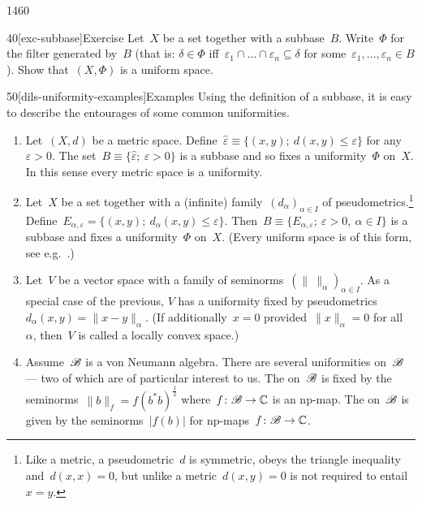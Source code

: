 \begin{parsec}{1460}
\begin{point}{40}[exc-subbase]{Exercise}%
Let~$X$ be a set together with a subbase~$B$.
Write~$\Phi$ for the filter generated by~$B$
    (that is: $\delta \in \Phi$
        iff~$\varepsilon_1 \cap \ldots \cap \varepsilon_n \subseteq \delta$
            for some~$\varepsilon_1, \ldots, \varepsilon_n \in B$).
Show that~$(X,\Phi)$ is a uniform space.
\end{point}
\begin{point}{50}[dils-uniformity-examples]{Examples}%
Using the definition of a subbase, it is easy
to describe the entourages of some common uniformities.
    \begin{enumerate}
        \item
    Let~$(X,d)$ be a metric space.
Define~$\hat\varepsilon \equiv \{(x,y);\ d(x,y) \leq \varepsilon\}$
for any $\varepsilon > 0$.
The set~$B \equiv \{ \hat\varepsilon; \ \varepsilon > 0\}$
is a subbase and so fixes a uniformity~$\Phi$ on~$X$.
In this sense every metric space is a uniformity.
        \item
    Let~$X$ be a set together with a (infinite)
            family~$(d_{\alpha})_{\alpha\in I}$
            of pseudometrics.\footnote{Like a metric,
                a pseudometric~$d$ is symmetric,
                obeys the triangle inequality
                    and~$d(x,x)=0$,
                    but unlike a metric~$d(x,y)=0$
                    is not required to entail~$x=y$.}
    Define~$E_{\alpha,\varepsilon} = \{ (x,y); \ d_\alpha(x,y)
            \leq \varepsilon\}$.
            Then~$B \equiv \{ E_{\alpha,\varepsilon}; \ \varepsilon > 0, \ 
                    \alpha \in I\}$
                    is a subbase and fixes
                    a uniformity~$\Phi$ on~$X$.
(Every uniform space is of this form, see e.g.~\cite[thm.~39.11]{willard}.)
\item
Let~$V$ be a vector space with a
family of seminorms~$(\|\  \|_\alpha)_{\alpha \in I}$.
As a special case of the previous,
 $V$ has a uniformity fixed by
    pseudometrics~$d_\alpha(x,y) = \|x-y\|_\alpha$.
    (If additionally~$x =0$ provided~$\|x\|_\alpha = 0$ for all~$\alpha$,
    then~$V$ is called a locally convex space.)

\item
Assume~$\mathscr{B}$ is a von Neumann algebra.
There are several uniformities on~$\mathscr{B}$ --- two of which
    are of particular interest to us.
    The  on~$\mathscr{B}$
is fixed by the seminorms~$\|b\|_f = f(b^*b)^{\frac{1}{2}}$
        where~$f\colon \mathscr{B} \to \mathbb{C}$ is an np-map.
        The  on~$\mathscr{B}$
    is given by the seminorms~$|f(b)|$
        for np-maps~$f\colon \mathscr{B} \to \mathbb{C}$.


\end{enumerate}
\end{point}
\end{parsec}

